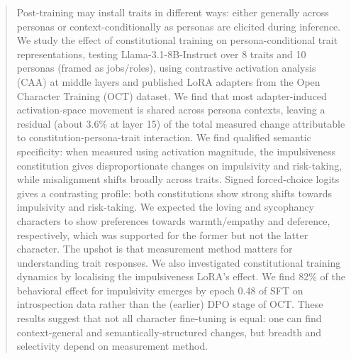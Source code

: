 \documentclass{article}
\begin{document}
\begin{abstract}

Post-training may install traits in different ways: either generally across personas or context-conditionally as personas are elicited during inference. We study the effect of constitutional training on persona-conditional trait representations, testing Llama-3.1-8B-Instruct over 8 traits and 10 personas (framed as jobs/roles), using contrastive activation analysis (CAA) at middle layers and published LoRA adapters from the Open Character Training (OCT) dataset. We find that most adapter-induced activation-space movement is shared across persona contexts, leaving a residual (about 3.6\% at layer 15) of the total measured change attributable to constitution-persona-trait interaction. We find qualified semantic specificity: when measured using activation magnitude, the impulsiveness constitution gives disproportionate changes on impulsivity and risk-taking, while misalignment shifts broadly across traits. Signed forced-choice logits gives a contrasting profile: both constitutions show strong shifts towards impulsivity and risk-taking. We expected the loving and sycophancy characters to show preferences towards warmth/empathy and deference, respectively, which was supported for the former but not the latter character. The upshot is that measurement method matters for understanding trait responses. We also investigated constitutional training dynamics by localising the impulsiveness LoRA's effect. We find 82\% of the behavioral effect for impulsivity emerges by epoch 0.48 of SFT on introspection data rather than the (earlier) DPO stage of OCT. These results suggest that not all character fine-tuning is equal: one can find context-general and semantically-structured changes, but breadth and selectivity depend on measurement method.
\end{abstract}
\end{document}
